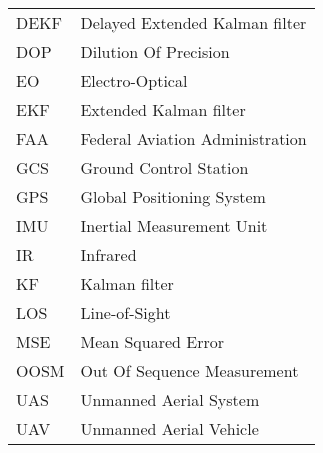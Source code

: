 %
%
%
%

\begin{acronyms}

\renewcommand{\arraystretch}{1.5}
\setlength{\tabcolsep}{3mm}
{\begin {tabular}{ll}
DEKF  &Delayed Extended Kalman filter\\
DOP   &Dilution Of Precision \\
EO	  &Electro-Optical \\
EKF   &Extended Kalman filter\\
FAA   &Federal Aviation Administration \\
GCS   &Ground Control Station \\
GPS   &Global Positioning System \\
IMU   &Inertial Measurement Unit \\
IR    &Infrared \\
KF   &Kalman filter\\
LOS  &Line-of-Sight\\
MSE   &Mean Squared Error \\
OOSM  &Out Of Sequence Measurement \\
UAS  &Unmanned Aerial System\\
UAV  &Unmanned Aerial Vehicle\\



\end {tabular}}

\end{acronyms}
